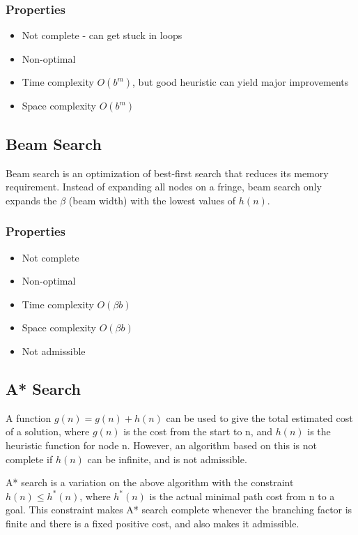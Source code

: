 \documentclass[12pt,titlepage]{article}
\begin{document}
      \subsubsection{Properties}
        \begin{itemize}
          \item Not complete - can get stuck in loops
          \item Non-optimal
          \item Time complexity $O(b^m)$, but good heuristic can yield major improvements
          \item Space complexity $O(b^m)$
        \end{itemize}

    \subsection{Beam Search}
      Beam search is an optimization of best-first search that reduces its memory requirement. Instead of expanding all nodes on a fringe,
      beam search only expands the $\beta$ (beam width) with the lowest values of $h(n)$.

      \subsubsection{Properties}
        \begin{itemize}
          \item Not complete
          \item Non-optimal
          \item Time complexity $O(\beta b)$
          \item Space complexity $O(\beta b)$
          \item Not admissible
        \end{itemize}

    \subsection{A* Search}
      A function $g(n) = g(n) + h(n)$ can be used to give the total estimated cost of a solution, where $g(n)$ is the cost from the start to n,
      and $h(n)$ is the heuristic function for node n. However, an algorithm based on this is not complete if $h(n)$ can be infinite, and is
      not admissible.

      A* search is a variation on the above algorithm with the constraint $h(n) \leq h^*(n)$, where $h^*(n)$ is the actual minimal path cost from
      n to a goal. This constraint makes A* search complete whenever the branching factor is finite and there is a fixed positive cost, and also
      makes it admissible.
\end{document}
